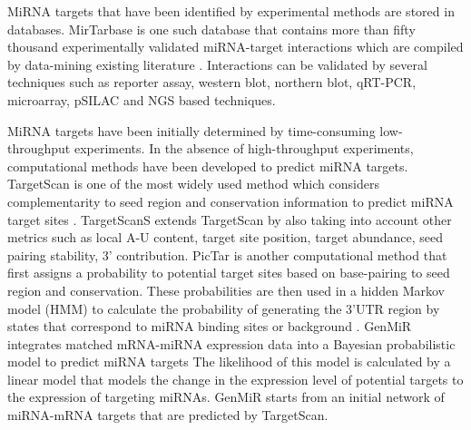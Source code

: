 

MiRNA targets that have been identified by experimental methods are stored in databases. MirTarbase is one such database that contains more than fifty thousand experimentally validated miRNA-target interactions which are compiled by data-mining existing literature \cite{mirtarbase}. Interactions can be validated by several techniques such as reporter assay, western blot, northern blot, qRT-PCR, microarray, pSILAC and NGS based techniques. 

MiRNA targets have been initially determined by time-consuming low-throughput experiments. In the absence of high-throughput experiments, computational methods have been developed to predict miRNA targets. TargetScan is one of the most widely used method which considers complementarity to seed region and conservation information to predict miRNA target sites \cite{targetscan_05}. TargetScanS extends TargetScan by also taking into account other metrics such as local A-U content, target site position, target abundance, seed pairing stability, 3’ contribution. PicTar is another computational method that first assigns a probability to potential target sites based on base-pairing to seed region and conservation. These probabilities are then used in a hidden Markov model (HMM) to calculate the probability of generating the 3’UTR region by states that correspond to miRNA binding sites or background \cite{pictar_05}. GenMiR integrates matched mRNA-miRNA expression data into a Bayesian probabilistic model to predict miRNA targets \cite{genmir_2007} The likelihood of this model is calculated by a linear model that models the change in the expression level of potential targets to the expression of targeting miRNAs. GenMiR starts from an initial network of miRNA-mRNA targets that are predicted by TargetScan.

